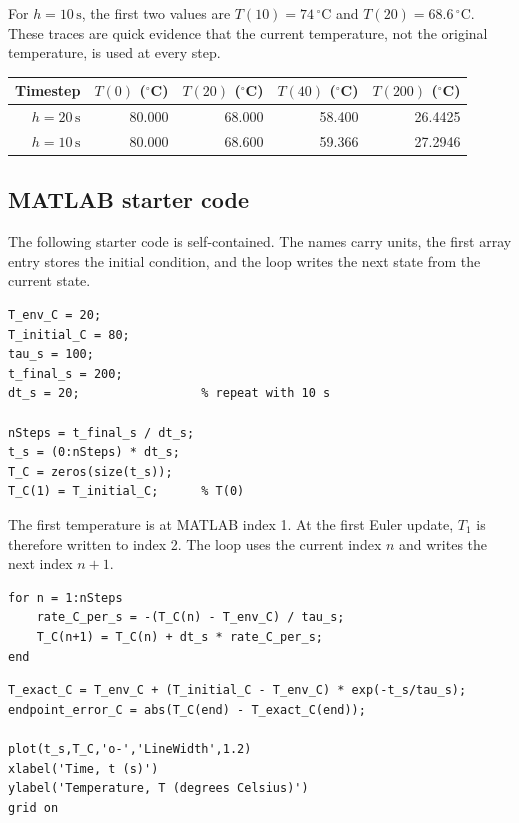 \documentclass[11pt,a4paper]{article}
\newcommand{\units}[1]{\,\mathrm{#1}}
\begin{document}
For $h=10\units{s}$, the first two values are $T(10)=74\units{^\circ C}$ and $T(20)=68.6\units{^\circ C}$. These traces are quick evidence that the current temperature, not the original temperature, is used at every step.

\begin{center}\small
\begin{tabular}{rrrrr}
\toprule
\textbf{Timestep} & $T(0)$ ($^\circ$C) & $T(20)$ ($^\circ$C) & $T(40)$ ($^\circ$C) & $T(200)$ ($^\circ$C) \\
\midrule
$h=20\units{s}$ & 80.000 & 68.000 & 58.400 & 26.4425 \\
$h=10\units{s}$ & 80.000 & 68.600 & 59.366 & 27.2946 \\
\bottomrule
\end{tabular}
\end{center}

\subsection*{MATLAB starter code}
The following starter code is self-contained. The names carry units, the first array entry stores the initial condition, and the loop writes the next state from the current state.

\begin{lstlisting}[style=matlabstyle,caption={MATLAB starter code for Euler cooling: inputs, time grid, and initial state}]
T_env_C = 20;
T_initial_C = 80;
tau_s = 100;
t_final_s = 200;
dt_s = 20;                 % repeat with 10 s

nSteps = t_final_s / dt_s;
t_s = (0:nSteps) * dt_s;
T_C = zeros(size(t_s));
T_C(1) = T_initial_C;      % T(0)
\end{lstlisting}

The first temperature is at MATLAB index 1. At the first Euler update, $T_1$ is therefore written to index 2. The loop uses the current index $n$ and writes the next index $n+1$.

\begin{lstlisting}[style=matlabstyle,caption={MATLAB starter code for Euler cooling: current-state rate and update}]
for n = 1:nSteps
    rate_C_per_s = -(T_C(n) - T_env_C) / tau_s;
    T_C(n+1) = T_C(n) + dt_s * rate_C_per_s;
end
\end{lstlisting}

\begin{lstlisting}[style=matlabstyle,caption={MATLAB code for the cooling reference, endpoint error, and labelled output}]
T_exact_C = T_env_C + (T_initial_C - T_env_C) * exp(-t_s/tau_s);
endpoint_error_C = abs(T_C(end) - T_exact_C(end));

plot(t_s,T_C,'o-','LineWidth',1.2)
xlabel('Time, t (s)')
ylabel('Temperature, T (degrees Celsius)')
grid on
\end{lstlisting}
\end{document}
